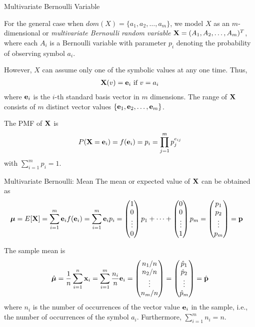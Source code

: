 \begin{frame}{Multivariate Bernoulli Variable}

  For the general case when $dom(X)=\{a_1,a_2,\dots,a_m\}$,
we model $X$ as an
$m$-dimensional or {\em multivariate Bernoulli random variable}
 $\mathbf{X} = (A_1, A_2,
\dots, A_m)^T$, where each $A_i$ is a Bernoulli variable with
parameter $p_i$ denoting the probability of observing symbol
$a_i$. 

\medskip
However, $X$ can assume only one of the symbolic
values at any one time. Thus,
\begin{align*}
    \mathbf{X}(v) = \mathbf{e}_i \text{ if } v = a_i
\end{align*}
where $\mathbf{e}_i$ is the $i$-th standard basis vector in $m$ dimensions.
The range of $\mathbf{X}$ consists of $m$ distinct vector
values $\{\mathbf{e}_1, \mathbf{e}_2, \dots, \mathbf{e}_m\}$.

\medskip
The PMF of $\mathbf{X}$ is
\begin{align*}
    P(\mathbf{X}=\mathbf{e}_i) = f(\mathbf{e}_i) = p_i = \prod_{j=1}^m p_{j}^{e_{ij}}
\end{align*}
with $\sum_{i=1}^m p_i = 1$.
\end{frame}


\begin{frame}{Multivariate Bernoulli: Mean}
The mean or expected value of $\mathbf{X}$ can be obtained as
\begin{align*}
    \bmu = E[\bX] & = \sum_{i=1}^m \be_i f(\be_i) =
    \sum_{i=1}^m \be_i p_i
     = \matr{1\\0 \\ \vdots \\ 0}p_1 + \cdots +
        \matr{0\\0\\\vdots\\1} p_m
    = \matr{p_1\\p_2\\ \vdots\\p_m} = \bp
\end{align*}

\medskip
The sample mean is 
\begin{align*}
    \hbmu = {1\over n} \sum_{i=1}^n \bx_i =
    \sum_{i=1}^m {n_i \over n} \be_i =
    \matr{n_1/n\\n_2/n\\ \vdots\\n_m/n} =
    \matr{\hp_1\\\hp_2\\\vdots\\\hp_m} = \hbp
\end{align*}
where $n_i$ is the number of occurrences
of the vector value $\mathbf{e}_i$ in the sample,
i.e., the number of occurrences
of the symbol $a_i$. 
Furthermore,
$\sum_{i=1}^m n_i = n$.
\end{frame}



